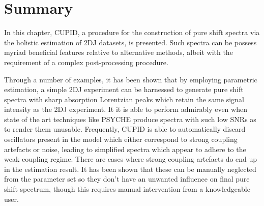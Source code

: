 \section{Summary}
In this chapter, \ac{CUPID}, a procedure for the construction of pure shift
spectra via the holistic estimation of \ac{2DJ} datasets, is presented.
Such spectra can be possess myriad beneficial features relative to alternative
methods, albeit with the requirement of a complex post-processing procedure.



Through a number of examples, it has been shown that by employing parametric
estimation, a simple \ac{2DJ} experiment can be harnessed to generate pure
shift spectra with sharp absorption Lorentzian peaks which retain the same
signal intensity as the \ac{2DJ} experiment. It it is able to perform
admirably even when state of the art techniques like \ac{PSYCHE} produce
spectra with such low \acp{SNR} as to render them unusable. Frequently, \ac{CUPID}
is able to automatically discard oscillators present in the model which either
correspond to strong coupling artefacts or noise, leading to simplified spectra
which appear to adhere to the weak coupling regime. There are cases where
strong coupling artefacts do end up in the estimation result. It has been shown
that these can be manually neglected from the parameter set so they don't have
an unwanted influence on final pure shift spectrum, though this requires manual
intervention from a knowledgeable user.

